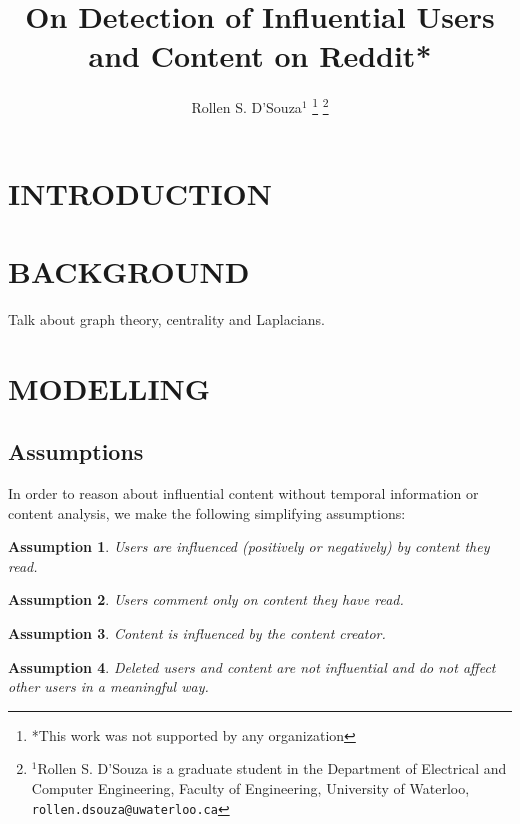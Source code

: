 \documentclass[letterpaper, 10 pt, conference]{ieeeconf}
\title{\LARGE \bf
On Detection of Influential Users and Content on Reddit*
}
\author{Rollen S. D'Souza$^{1}$%
  \thanks{*This work was not supported by any organization}%
  \thanks{$^{1}$Rollen S. D'Souza is a graduate student in the
    Department of Electrical and Computer Engineering,
    Faculty of Engineering,
    University of Waterloo,
    {\tt\small rollen.dsouza@uwaterloo.ca}
  }%
}
\theoremstyle{plain}
\newtheorem{assumption}{Assumption}[section]
\newcommand{\red}{\color{red}}
\begin{document}
\maketitle
\thispagestyle{empty}
\pagestyle{empty}


\begin{abstract}


\end{abstract}


\section{INTRODUCTION}


\section{BACKGROUND}
{\red Talk about graph theory, centrality and Laplacians.}

\section{MODELLING}

\subsection{Assumptions}
In order to reason about influential content without temporal information or content analysis, we make the following simplifying assumptions:

\begin{assumption}
  Users are influenced (positively or negatively) by content they read.
  \label{assume:1}
\end{assumption} 

\begin{assumption}
  Users comment only on content they have read.
  \label{assume:2}
\end{assumption}

\begin{assumption}
  Content is influenced by the content creator.
  \label{assume:3}
\end{assumption}

\begin{assumption}
  Deleted users and content are not influential and do not affect other users in a meaningful way.
  \label{assume:4}
\end{assumption}
\end{document}
